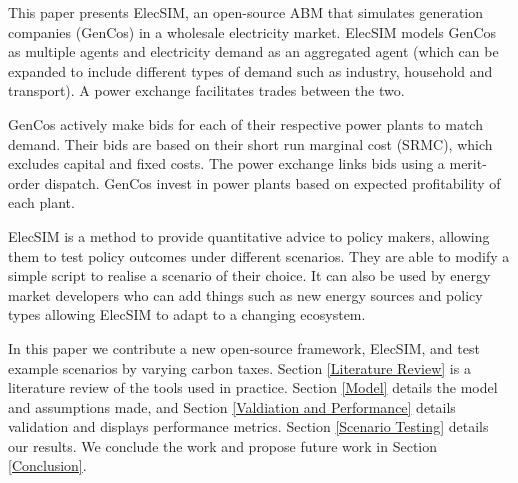 This paper presents ElecSIM, an open-source ABM that simulates generation companies (GenCos) in a wholesale electricity market. ElecSIM models GenCos as multiple agents and electricity demand as an aggregated agent (which can be expanded to include different types of demand such as industry, household and transport). A power exchange facilitates trades between the two. 

GenCos actively make bids for each of their respective power plants to match demand. Their bids are based on their short run marginal cost (SRMC), which excludes capital and fixed costs. The power exchange links bids  using a merit-order dispatch. GenCos invest in power plants based on expected profitability of each plant.	

ElecSIM is a method to provide quantitative advice to policy makers, allowing them to test policy outcomes under different scenarios. They are able to modify a simple script to realise a scenario of their choice. It can also be used by energy market developers who can add things such as new energy sources and policy types allowing ElecSIM to adapt to a changing ecosystem.







In this paper we contribute a new open-source framework, ElecSIM, and test example scenarios by varying carbon taxes. Section \ref{Literature Review} is a literature review of the tools used in practice. Section \ref{Model} details the model and assumptions made, and Section \ref{Valdiation and Performance} details validation and displays performance metrics. Section \ref{Scenario Testing} details our results. We conclude the work and propose future work in Section \ref{Conclusion}.


